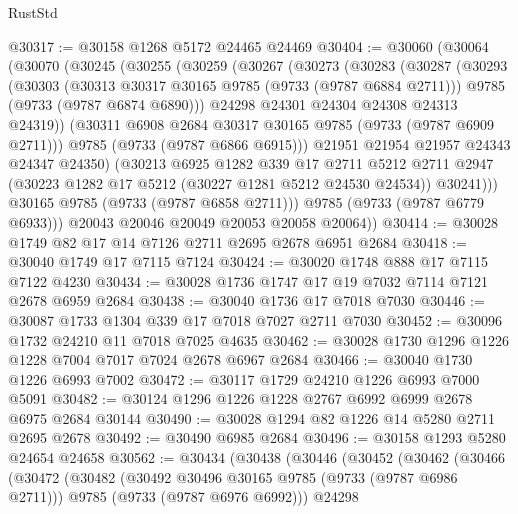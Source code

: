 \begin{lexlean}{RustStd}
\begin{coremodule}
{\begin{coremodule}
{{{{{{{{{{{{{{{{{{{{{{{{{{{{{{{{{{{{{{{{{{{{{{{{{{{{{{{@30317 := @30158 @1268 @5172 @24465 @24469
@30404 := @30060
    (@30064
      (@30070
        (@30245
          (@30255
            (@30259
              (@30267
                (@30273
                  (@30283
                    (@30287
                      (@30293
                        (@30303
                          (@30313 @30317 @30165 @9785 (@9733 (@9787 @6884 @2711)))
                          @9785
                          (@9733 (@9787 @6874 @6890)))
                        @24298
                        @24301
                        @24304
                        @24308
                        @24313
                        @24319))
                    (@30311 @6908 @2684 @30317 @30165 @9785 (@9733 (@9787 @6909 @2711)))
                    @9785
                    (@9733 (@9787 @6866 @6915)))
                  @21951
                  @21954
                  @21957
                  @24343
                  @24347
                  @24350)
                (@30213
                  @6925
                  @1282
                  @339
                  @17
                  @2711
                  @5212
                  @2711
                  @2947
                  (@30223 @1282 @17 @5212 (@30227 @1281 @5212 @24530 @24534))
                  @30241)))
            @30165
            @9785
            (@9733 (@9787 @6858 @2711)))
          @9785
          (@9733 (@9787 @6779 @6933)))
        @20043
        @20046
        @20049
        @20053
        @20058
        @20064))
@30414 := @30028 @1749 @82 @17 @14 @7126 @2711 @2695 @2678 @6951 @2684
@30418 := @30040 @1749 @17 @7115 @7124
@30424 := @30020 @1748 @888 @17 @7115 @7122 @4230
@30434 := @30028 @1736 @1747 @17 @19 @7032 @7114 @7121 @2678 @6959 @2684
@30438 := @30040 @1736 @17 @7018 @7030
@30446 := @30087 @1733 @1304 @339 @17 @7018 @7027 @2711 @7030
@30452 := @30096 @1732 @24210 @11 @7018 @7025 @4635
@30462 := @30028 @1730 @1296 @1226 @1228 @7004 @7017 @7024 @2678 @6967 @2684
@30466 := @30040 @1730 @1226 @6993 @7002
@30472 := @30117 @1729 @24210 @1226 @6993 @7000 @5091
@30482 := @30124 @1296 @1226 @1228 @2767 @6992 @6999 @2678 @6975 @2684 @30144
@30490 := @30028 @1294 @82 @1226 @14 @5280 @2711 @2695 @2678
@30492 := @30490 @6985 @2684
@30496 := @30158 @1293 @5280 @24654 @24658
@30562 := @30434
    (@30438
      (@30446
        (@30452
          (@30462
            (@30466
              (@30472
                (@30482
                  (@30492 @30496 @30165 @9785 (@9733 (@9787 @6986 @2711)))
                  @9785
                  (@9733 (@9787 @6976 @6992)))
                @24298
}}}}}}}}}}}}}}}}}}}}}}}}}}}}}}}}}}}}}}}}}}}}}}}}}}}}}}}
\end{coremodule}}
\end{coremodule}
\end{lexlean}
